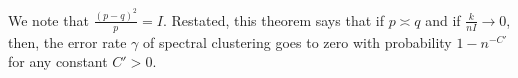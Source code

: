 \documentclass{article}
\begin{document}
We note that $\frac{(p-q)^2}{p} = I$. Restated, this theorem says that if $p \asymp q$ and if $ \frac{k}{nI} \rightarrow 0$, then, the error rate $\gamma$ of spectral clustering goes to zero with probability $1 - n^{-C'}$ for any constant $C' > 0$. 



\end{document}
